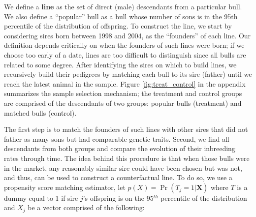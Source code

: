 \documentclass[12pt,letterpaper]{article}
\begin{document}
We define a \textbf{line} as the set of direct (male) descendants from a particular bull.
We also define a ``popular'' bull as a bull whose number of sons is in the 95th percentile of the distribution of offspring. 
To construct the line, we start by considering sires born between 1998 and 2004, as the ``founders'' of each line.
Our definition depends critically on when the founders of such lines were born; if we choose too early of a date, lines are too difficult to distinguish since all bulls are related to some degree.
After identifying the sires on which to build lines, we recursively build their pedigrees by matching each bull to its sire (father) until we reach the latest animal in the sample. 
Figure \ref{fig:treat_control} in the appendix summarizes the sample selection mechanism; the treatment and control groups are comprised of the descendants of two groups: popular bulls (treatment) and matched bulls (control).




The first step is to match the founders of such lines with other sires that did not father as many sons but had comparable genetic traits. Second, we find all descendants from both groups and compare the evolution of their inbreeding rates through time. 
The idea behind this procedure is that when those bulls were in the market, any reasonably similar sire could have been chosen but was not, and thus, can be used to construct a counterfactual line. 
 To do so, we use a propensity score matching estimator, let $p(X)=\Pr(T_{j} = 1 | \mathbf{X})$ where $T$ is a dummy equal to 1 if sire $j$'s offspring is on the 95$^{th}$ percentile of the distribution and $X_{j}$ be a vector comprised of the following:
\end{document}
